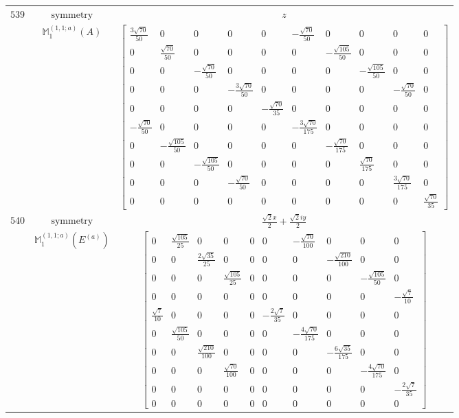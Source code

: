 \documentclass[fleqn,8pt,landscape]{jsarticle}
\begin{document}
\begin{longtable}{ccc}
$ 539 $ & $ \text{symmetry} $ & $ z $ \\
$  $ & $ \mathbb{M}_{1}^{(1,1;a)}(A) $ & $ \begin{bmatrix} \frac{3 \sqrt{70}}{50} & 0 & 0 & 0 & 0 & - \frac{\sqrt{70}}{50} & 0 & 0 & 0 & 0 \\ 0 & \frac{\sqrt{70}}{50} & 0 & 0 & 0 & 0 & - \frac{\sqrt{105}}{50} & 0 & 0 & 0 \\ 0 & 0 & - \frac{\sqrt{70}}{50} & 0 & 0 & 0 & 0 & - \frac{\sqrt{105}}{50} & 0 & 0 \\ 0 & 0 & 0 & - \frac{3 \sqrt{70}}{50} & 0 & 0 & 0 & 0 & - \frac{\sqrt{70}}{50} & 0 \\ 0 & 0 & 0 & 0 & - \frac{\sqrt{70}}{35} & 0 & 0 & 0 & 0 & 0 \\ - \frac{\sqrt{70}}{50} & 0 & 0 & 0 & 0 & - \frac{3 \sqrt{70}}{175} & 0 & 0 & 0 & 0 \\ 0 & - \frac{\sqrt{105}}{50} & 0 & 0 & 0 & 0 & - \frac{\sqrt{70}}{175} & 0 & 0 & 0 \\ 0 & 0 & - \frac{\sqrt{105}}{50} & 0 & 0 & 0 & 0 & \frac{\sqrt{70}}{175} & 0 & 0 \\ 0 & 0 & 0 & - \frac{\sqrt{70}}{50} & 0 & 0 & 0 & 0 & \frac{3 \sqrt{70}}{175} & 0 \\ 0 & 0 & 0 & 0 & 0 & 0 & 0 & 0 & 0 & \frac{\sqrt{70}}{35} \end{bmatrix} $ \\ \hline
$ 540 $ & $ \text{symmetry} $ & $ \frac{\sqrt{2} x}{2} + \frac{\sqrt{2} i y}{2} $ \\
$  $ & $ \mathbb{M}_{1}^{(1,1;a)}(E^{(a)}) $ & $ \begin{bmatrix} 0 & \frac{\sqrt{105}}{25} & 0 & 0 & 0 & 0 & - \frac{\sqrt{70}}{100} & 0 & 0 & 0 \\ 0 & 0 & \frac{2 \sqrt{35}}{25} & 0 & 0 & 0 & 0 & - \frac{\sqrt{210}}{100} & 0 & 0 \\ 0 & 0 & 0 & \frac{\sqrt{105}}{25} & 0 & 0 & 0 & 0 & - \frac{\sqrt{105}}{50} & 0 \\ 0 & 0 & 0 & 0 & 0 & 0 & 0 & 0 & 0 & - \frac{\sqrt{7}}{10} \\ \frac{\sqrt{7}}{10} & 0 & 0 & 0 & 0 & - \frac{2 \sqrt{7}}{35} & 0 & 0 & 0 & 0 \\ 0 & \frac{\sqrt{105}}{50} & 0 & 0 & 0 & 0 & - \frac{4 \sqrt{70}}{175} & 0 & 0 & 0 \\ 0 & 0 & \frac{\sqrt{210}}{100} & 0 & 0 & 0 & 0 & - \frac{6 \sqrt{35}}{175} & 0 & 0 \\ 0 & 0 & 0 & \frac{\sqrt{70}}{100} & 0 & 0 & 0 & 0 & - \frac{4 \sqrt{70}}{175} & 0 \\ 0 & 0 & 0 & 0 & 0 & 0 & 0 & 0 & 0 & - \frac{2 \sqrt{7}}{35} \\ 0 & 0 & 0 & 0 & 0 & 0 & 0 & 0 & 0 & 0 \end{bmatrix} $ \\ \hline

\end{longtable}
\end{document}
